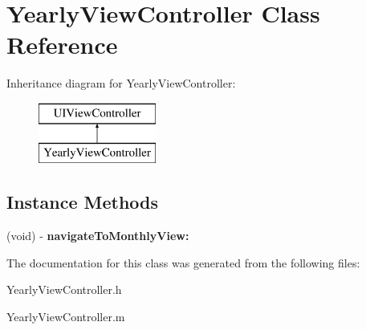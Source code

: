 \hypertarget{interface_yearly_view_controller}{\section{Yearly\+View\+Controller Class Reference}
\label{interface_yearly_view_controller}
}
Inheritance diagram for Yearly\+View\+Controller\+:\begin{figure}[H]
\begin{center}
\leavevmode
\includegraphics[height=2.000000cm]{interface_yearly_view_controller}
\end{center}
\end{figure}
\subsection*{Instance Methods}
\begin{DoxyCompactItemize}
\item 
\hypertarget{interface_yearly_view_controller_aeccf85df5945090d882092f84ae1f534}{(void) -\/ {\bfseries navigate\+To\+Monthly\+View\+:}}\label{interface_yearly_view_controller_aeccf85df5945090d882092f84ae1f534}

\end{DoxyCompactItemize}


The documentation for this class was generated from the following files\+:\begin{DoxyCompactItemize}
\item 
Yearly\+View\+Controller.\+h\item 
Yearly\+View\+Controller.\+m\end{DoxyCompactItemize}
